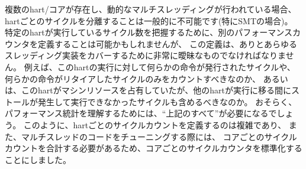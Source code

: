 \begin{commentary}
\begin{comment}
Where there is more than one hart/core and dynamic multithreading, it
is not generally possible to separate out cycles per hart (especially
with SMT).  It might be possible to define a separate performance
counter that tried to capture the number of cycles a particular hart
was running, but this definition would have to be very fuzzy to cover
all the possible threading implementations.  For example, should we
only count cycles for which any instruction was issued to execution
for this hart, and/or cycles any instruction retired, or include
cycles this hart was occupying machine resources but couldn't execute
due to stalls while other harts went into execution? Likely, ``all of
the above'' would be needed to have understandable performance stats.
This complexity of defining a per-hart cycle count, and also the need
in any case for a total per-core cycle count when tuning multithreaded
code led to just standardizing the per-core cycle counter, which also
happens to work well for the common single hart/core case.
\end{comment}

複数のhart/コアが存在し、動的なマルチスレッディングが行われている場合、
hartごとのサイクルを分離することは一般的に不可能です(特にSMTの場合)。
特定のhartが実行しているサイクル数を把握するために、別のパフォーマンスカウンタを定義することは可能かもしれませんが、
この定義は、ありとあらゆるスレッディング実装をカバーするために非常に曖昧なものでなければなりません。 
例えば、このhartの実行に対して何らかの命令が発行されたサイクルや、
何らかの命令がリタイアしたサイクルのみをカウントすべきなのか、
あるいは、このhartがマシンリソースを占有していたが、他のhartが実行に移る間にストールが発生して実行できなかったサイクルも含めるべきなのか。
おそらく、パフォーマンス統計を理解するためには、``上記のすべて''が必要になるでしょう。
このように、hartごとのサイクルカウントを定義するのは複雑であり、
また、マルチスレッドのコードをチューニングする際には、
コアごとのサイクルカウントを合計する必要があるため、コアごとのサイクルカウンタを標準化することにしました。

\begin{comment}
Standardizing what happens during ``sleep'' is not practical given
that what ``sleep'' means is not standardized across execution
environments, but if the entire core is paused (entirely clock-gated
or powered-down in deep sleep), then it is not executing clock cycles,
and the cycle count shouldn't be increasing per the spec.  There are
many details, e.g., whether clock cycles required to reset a processor
after waking up from a power-down event should be counted, and these
are considered execution-environment-specific details.
\end{comment}


\end{commentary}
